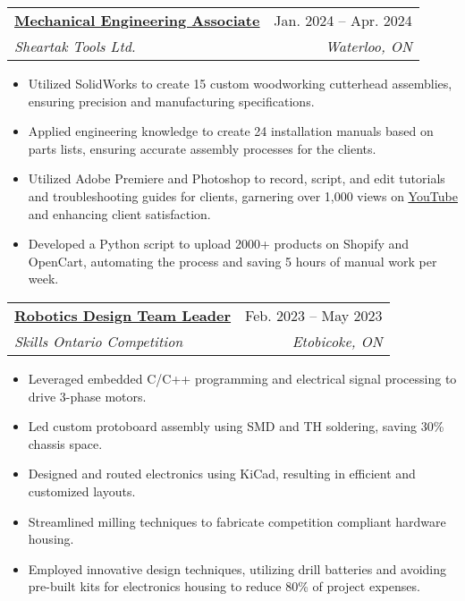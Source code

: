 \documentclass[letterpaper]{article}
\makeatletter
\newcommand{\resumeItem}[1]{
  \item\small{
    {#1 \vspace{-2pt}}
  }
}
\newcommand{\resumeSubheading}[4]{
  \vspace{-2pt}\item
    \begin{tabular*}{0.97\textwidth}[t]{l@{\extracolsep{\fill}}r}
      \textbf{#1} & #2 \\
      \textit{\small#3} & \textit{\small #4} \\
    \end{tabular*}\vspace{-7pt}
}
\newcommand{\resumeItemListStart}{\begin{itemize}}
\newcommand{\resumeItemListEnd}{\end{itemize}\vspace{-5pt}}
\makeatother
\begin{document}
    \resumeSubheading
      {\underline{\href{https://www.youtube.com/playlist?list=PL2zKq55_kXLeLsMzZH8ny8A34vHwAoc7n}{Mechanical Engineering Associate}}}{Jan. 2024 -- Apr. 2024}
      {Sheartak Tools Ltd.}{Waterloo, ON}
      \resumeItemListStart
        \resumeItem{Utilized SolidWorks to create 15 custom woodworking cutterhead assemblies, ensuring precision and manufacturing specifications.}
        \resumeItem{Applied engineering knowledge to create 24 installation manuals based on parts lists, ensuring accurate assembly processes for the clients.}
        \resumeItem{Utilized Adobe Premiere and Photoshop to record, script, and edit tutorials and troubleshooting guides for clients, garnering over 1,000 views on \underline{\href{https://www.youtube.com/playlist?list=PL2zKq55_kXLeLsMzZH8ny8A34vHwAoc7n}{YouTube}} and enhancing client satisfaction.}
        \resumeItem{Developed a Python script to upload 2000+ products on Shopify and OpenCart, automating the process and saving 5 hours of manual work per week.}
      \resumeItemListEnd

    \resumeSubheading
      {\underline{\href{https://www.gavintranquilino.com/hockey-robot.html}{Robotics Design Team Leader}}}{Feb. 2023 -- May 2023}
      {Skills Ontario Competition}{Etobicoke, ON}
      \resumeItemListStart
        \resumeItem{Leveraged embedded C/C++ programming and electrical signal processing to drive 3-phase motors.}
        \resumeItem{Led custom protoboard assembly using SMD and TH soldering, saving 30\% chassis space.}
        \resumeItem{Designed and routed electronics using KiCad, resulting in efficient and customized layouts.}
        \resumeItem{Streamlined milling techniques to fabricate competition compliant hardware housing.}
        \resumeItem{Employed innovative design techniques, utilizing drill batteries and avoiding pre-built kits for electronics housing to reduce 80\% of project expenses.}
    \resumeItemListEnd
    
\end{document}
